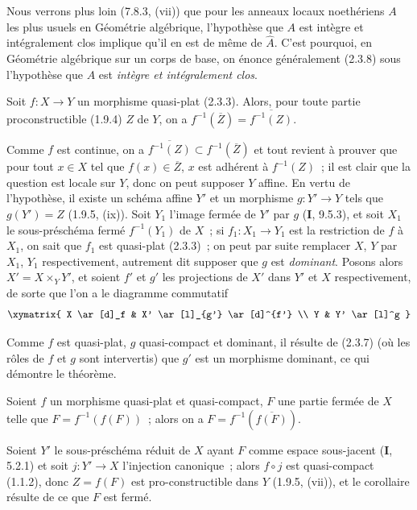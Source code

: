 \begin{remark}[2.3.9]
\label{IV.2.3.9-fr}
Nous verrons plus loin (7.8.3, (vii)) que pour les anneaux locaux noethériens
$A$ les plus usuels en Géométrie algébrique, l'hypothèse que $A$ est intègre
et intégralement clos implique qu'il en est de même de $\widehat A$. C'est
pourquoi, en Géométrie algébrique sur un corps de base, on énonce généralement
(2.3.8) sous l'hypothèse que $A$ est \emph{intègre et intégralement clos}.
\end{remark}

\begin{theorem}[2.3.10]
\label{IV.2.3.10-fr}
Soit $f:X\to Y$ un morphisme quasi-plat \textup{(2.3.3)}. Alors, pour toute partie
proconstructible \textup{(1.9.4)} $Z$ de $Y$, on a
$f^{-1}(\overline Z)=\overline{f^{-1}(Z)}$.
\end{theorem}

Comme $f$ est continue, on a
$\overline{f^{-1}(Z)}\subset f^{-1}(\overline Z)$ et tout revient à prouver
que pour tout $x\in X$ tel que $f(x)\in\overline Z$, $x$ est adhérent à
$f^{-1}(Z)$~; il est clair que la question est locale sur $Y$, donc on peut
supposer $Y$ affine. En vertu de l'hypothèse, il existe un schéma affine $Y'$
et un morphisme $g:Y'\to Y$ tels que $g(Y')=Z$ (1.9.5, (ix)). Soit $Y_1$
l'image fermée de $Y'$ par $g$ (\textbf{I}, 9.5.3), et soit $X_1$ le sous-préschéma
fermé $f^{-1}(Y_1)$ de $X$~; si $f_1:X_1\to Y_1$ est la restriction de $f$ à
$X_1$, on sait que $f_1$ est quasi-plat (2.3.3)~; on peut par suite remplacer
$X$, $Y$ par $X_1$, $Y_1$ respectivement, autrement dit supposer que $g$ est
\emph{dominant}. Posons alors $X'=X\times_Y Y'$, et soient $f'$ et $g'$ les
projections de $X'$ dans $Y'$ et $X$ respectivement, de sorte que l'on a le
diagramme commutatif
\[
\xymatrix{
  X \ar[d]_f & X' \ar[l]_{g'} \ar[d]^{f'} \\
  Y & Y' \ar[l]^g
}
\]

Comme $f$ est quasi-plat, $g$ quasi-compact et dominant, il résulte de (2.3.7)
(où les rôles de $f$ et $g$ sont intervertis) que $g'$ est un morphisme
dominant, ce qui démontre le théorème.

\begin{corollary}[2.3.11]
\label{IV.2.3.11-fr}
Soient $f$ un morphisme quasi-plat et quasi-compact, $F$ une partie fermée de
$X$ telle que $F=f^{-1}(f(F))$~; alors on a
$F=f^{-1}(\overline{f(F)})$.
\end{corollary}

Soient $Y'$ le sous-préschéma réduit de $X$ ayant $F$ comme espace sous-jacent
(\textbf{I}, 5.2.1) et soit $j:Y'\to X$ l'injection canonique~; alors $f\circ j$ est
quasi-compact (1.1.2),
donc $Z=f(F)$ est pro-constructible dans $Y$ (1.9.5, (vii)), et le corollaire
résulte de ce que $F$ est fermé.

